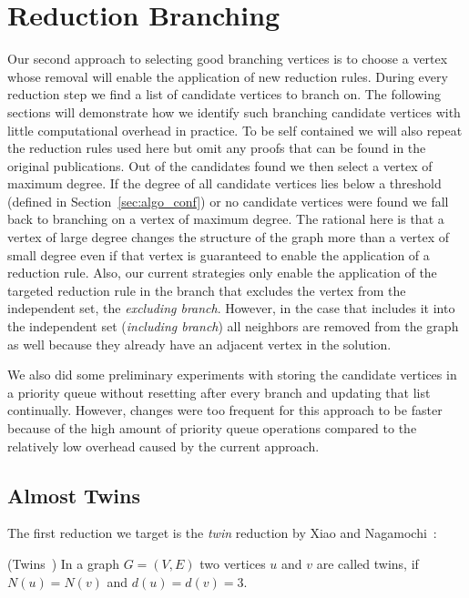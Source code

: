 \documentclass[a4paper,UKenglish,cleveref, autoref, thm-restate]{lipics-v2021}
\begin{document}
\section{Reduction Branching}\label{sec:reduction_branching}
Our second approach to selecting good branching vertices is to choose a vertex
whose removal will enable the application of new reduction rules. During every
reduction step we find a list of candidate vertices to branch on. The following
sections will demonstrate how we identify such branching candidate vertices with little
computational overhead in practice. To be self contained we will also repeat the reduction
rules used here but omit any proofs that can be found in the original
publications. Out of the candidates found we then select a vertex of
maximum degree. If the degree of all candidate vertices lies below a threshold
(defined in Section~\ref{sec:algo_conf}) or no candidate vertices were found we fall back to branching on a vertex
of maximum degree. The rational here is that a vertex of large degree changes
the structure of the graph more than a vertex of small degree even if that
vertex is guaranteed to enable the application of a reduction rule. Also, our
current strategies only enable the application of the targeted reduction rule in
the branch that excludes the vertex from the independent set, the
\emph{excluding branch}. However, in the
case that includes it into the independent set (\emph{including branch}) all neighbors are removed from
the graph as well because they already have an adjacent vertex in the solution.

We also did some preliminary experiments with storing the candidate vertices in
a priority queue without resetting after every branch and updating that list continually.
However, changes were too frequent for this approach to be faster because of
the high amount of priority queue operations compared to the relatively low overhead
caused by the current approach.

\subsection{Almost Twins}

The first reduction we target is the \emph{twin} reduction by Xiao and Nagamochi~\cite{XiaoUnconfined}:

\begin{definition}(Twins~\cite{XiaoUnconfined})
  In a graph $G=(V,E)$ two vertices $u$ and $v$ are called twins, if $N(u) = N(v)$ and $d(u) = d(v) = 3$.
\end{definition}
\end{document}
